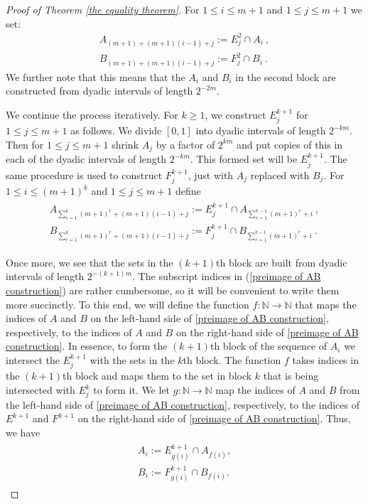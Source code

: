 \documentclass[12pt]{article}
\begin{document}
\begin{proof}[Proof of Theorem \ref{the equality theorem}]
    For $1 \leq i \leq m+1$ and $1 \leq j \leq m+1$ we set:
    \begin{align*}
        A_{(m+1)+(m+1)(i-1)+j}:= E^2_j \cap A_i ~,\\
        B_{(m+1)+(m+1)(i-1)+j}:= F^2_j \cap B_i ~.
    \end{align*}
    We further note that this means that the $A_i$ and $B_i$ in the second block are constructed from dyadic intervals of length $2^{-2m}$.

    
    We continue the process iteratively. For $k \geq 1$, we construct $E^{k+1}_j$ for $1 \leq j \leq m+1$ as follows. We divide $[0,1]$ into dyadic intervals of length $2^{-km}$. Then for $1\leq j \leq m+1$ shrink $A_j$ by a factor of $2^{km}$ and put copies of this in each of the dyadic intervals of length $2^{-km}$. This formed set will be $E^{k+1}_j$. The same procedure is used to construct $F_{j}^{k+1}$, just with $A_j$ replaced with $B_j$. For $1 \leq i \leq (m+1)^k$ and $1 \leq j \leq m+1$ define
    \begin{align}
    \begin{split}\label{preimage of AB construction}
        A_{\sum_{r=1}^{k}(m+1)^r +(m+1)(i-1)+j} :=E_j^{k+1} \cap A_{\sum_{r=1}^{k-1}(m+1)^r+i} ~,\\
        B_{\sum_{r=1}^{k}(m+1)^r +(m+1)(i-1)+j} :=F_j^{k+1} \cap B_{\sum_{r=1}^{k-1}(m+1)^r+i} ~.
        \end{split}
    \end{align}

Once more, we see that the sets in the $(k+1)$th block are built from dyadic intervals of length $2^{-(k+1)m}$. The subscript indices in (\ref{preimage of AB construction}) are rather cumbersome, so it will be convenient to write them more succinctly. To this end, we will define the function $f: \mathbb{N} \rightarrow \mathbb{N}$ that maps the indices of $A$ and $B$ on the left-hand side of \eqref{preimage of AB construction}, respectively, to the indices of $A$ and $B$ on the right-hand side of \eqref{preimage of AB construction}. In essence, to form the $(k+1)$th block of the sequence of $A_i$ we intersect the $E_j^{k+1}$ with the sets in the $k$th block. The function $f$ takes indices in the $(k+1)$th block and maps them to the set in block $k$ that is being intersected with $E_j^k$ to form it. We let $g: \mathbb{N} \rightarrow \mathbb{N}$ map the indices of $A$ and $B$ from the left-hand side of \eqref{preimage of AB construction}, respectively, to the indices of $E^{k+1}$ and $F^{k+1}$ on the right-hand side of \eqref{preimage of AB construction}. Thus, we have
\begin{align}
    \begin{split}\label{function index}
        A_{i} :=E_{g(i)}^{k+1} \cap A_{f(i)} ,\\
        B_{i} :=F_{g(i)}^{k+1} \cap B_{f(i)}. 
        \end{split}
    \end{align}


\end{proof}
\end{document}
